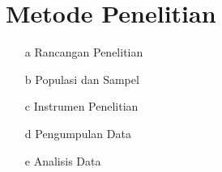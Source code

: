 \section{Metode Penelitian}

\begin{enumerate}
\item[a] Rancangan Penelitian
\item[b] Populasi dan Sampel
\item[c] Instrumen Penelitian
\item[d] Pengumpulan Data
\item[e] Analisis Data
\end{enumerate}
    